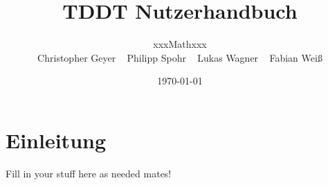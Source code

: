 \documentclass[10pt,a4paper]{article}
\begin{document}
\title{\large TDDT Nutzerhandbuch}
\date{\small \today}
\author{\normalsize xxxMathxxx \\
Christopher Geyer ~
Philipp Spohr ~
Lukas Wagner ~
Fabian Weiß }
\maketitle
\tableofcontents
\section{Einleitung}
Fill in your stuff here as needed mates!
\end{document}

